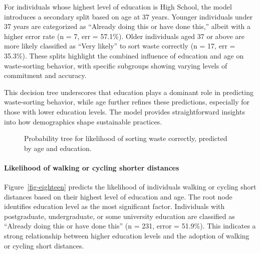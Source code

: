\documentclass[
  letterpaper,
  DIV=11,
  numbers=noendperiod]{scrartcl}
\let\oldparagraph\paragraph
\renewcommand{\paragraph}[1]{\oldparagraph{#1}\mbox{}}
\begin{document}
For individuals whose highest level of education is High School, the
model introduces a secondary split based on age at 37 years. Younger
individuals under 37 years are categorized as ``Already doing this or
have done this,'' albeit with a higher error rate (n = 7, err = 57.1\%).
Older individuals aged 37 or above are more likely classified as ``Very
likely'' to sort waste correctly (n = 17, err = 35.3\%). These splits
highlight the combined influence of education and age on waste-sorting
behavior, with specific subgroups showing varying levels of commitment
and accuracy.

This decision tree underscores that education plays a dominant role in
predicting waste-sorting behavior, while age further refines these
predictions, especially for those with lower education levels. The model
provides straightforward insights into how demographics shape
sustainable practices.

\begin{figure}


\caption{\label{fig-seventeen}Probability tree for likelihood of sorting
waste correctly, predicted by age and education.}

\end{figure}%

\paragraph{Likelihood of walking or cycling shorter
distances}\label{likelihood-of-walking-or-cycling-shorter-distances}

Figure~\ref{fig-eighteen} predicts the likelihood of individuals walking
or cycling short distances based on their highest level of education and
age. The root node identifies education level as the most significant
factor. Individuals with postgraduate, undergraduate, or some university
education are classified as ``Already doing this or have done this'' (n
= 231, error = 51.9\%). This indicates a strong relationship between
higher education levels and the adoption of walking or cycling short
distances.
\end{document}
